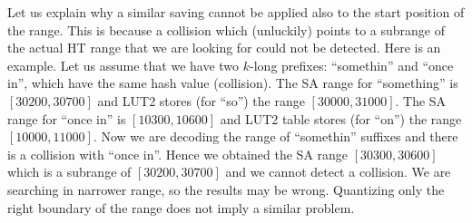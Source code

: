 \documentclass{cai}
\begin{document}
Let us explain why a similar saving cannot be applied also to the 
start position of the range.
This is because a collision which (unluckily) points to a subrange of 
the actual HT range that we are looking for could not be detected.
Here is an example.
Let us assume that we have two $k$-long prefixes: 
``somethin'' and ``once in'', which have the same hash value (collision).
The SA range for ``something'' is $[30200, 30700]$ and 
LUT2 stores (for ``so'') the range $[30000, 31000]$.
The SA range for ``once in'' is $[10300, 10600]$ and 
LUT2 table stores (for ``on'') the range $[10000, 11000]$.
Now we are decoding the range of ``somethin'' suffixes and 
there is a collision with ``once in''. 
Hence we obtained the SA range $[30300, 30600]$ which is a subrange of 
$[30200, 30700]$ and we cannot detect a collision. 
We are searching in narrower range, so the results may be wrong.
Quantizing only the right boundary of the range does not imply 
a similar problem.
\end{document}
